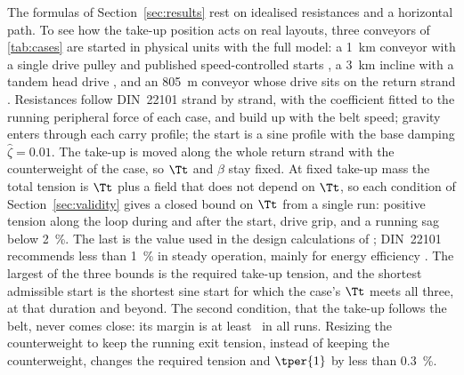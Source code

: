 The formulas of Section~\ref{sec:results} rest on idealised resistances and a horizontal
path. To see how the take-up position acts on real layouts, three conveyors of
\cref{tab:cases} are started in physical units with the full model: a \qty{1}{\kilo\metre}
conveyor with a single drive pulley and published speed-controlled starts
\citep[\S8.6.2]{lodewijks1996}, a \qty{3}{\kilo\metre} incline with a tandem head drive
\citep{suchorab2025longdistance}, and an \qty{805}{\metre} conveyor whose drive sits on the
return strand \citep{surtees1995runback}. Resistances follow DIN~22101 strand by strand, with
the coefficient fitted to the running peripheral force of each case, and build up with the
belt speed; gravity enters through each carry profile; the start is a sine profile with the
base damping $\hat\zeta=0.01$. The take-up is moved along the whole return strand with the
counterweight of the case, so $\Tt$ and $\beta$ stay fixed. At fixed take-up mass the total
tension is $\Tt$ plus a field that does not depend on $\Tt$, so each condition of
Section~\ref{sec:validity} gives a closed bound on $\Tt$ from a single run: positive tension
along the loop during and after the start, drive grip, and a running sag below
\qty{2}{\percent}. The last is the value used in the design calculations of
\citet{surtees1995runback}; DIN~22101 recommends less than \qty{1}{\percent} in steady
operation, mainly for energy efficiency \citep[\S8.2.3]{din22101}. The largest of the three
bounds is the required take-up tension, and the shortest admissible start is the shortest
sine start for which the case's $\Tt$ meets all three, at that duration and beyond. The
second condition, that the take-up follows the belt, never comes close: its margin is at
least \NumAppAccelMarginMin\ in all runs. Resizing the counterweight to keep the running exit
tension, instead of keeping the counterweight, changes the required tension and $\tper{1}$ by
less than \qty{0.3}{\percent}.

